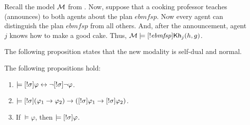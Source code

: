 \begin{example}\label{ex:sref}
Recall the model $\mathcal{M}$ from .
Now, suppose that a cooking professor teaches (announces) to both agents about the plan $\mathit{ebmfsp}$.
Now every agent can distinguish the plan $\mathit{ebmfsp}$ from all others.
And, after the announcement, agent~$j$ knows how to make a good cake.
Thus, $\mathcal{M} \models [!\mathit{ebmfsp}] {\sf Kh}_j(h,g)$.
\end{example}

\medskip

The following proposition states that the new modality is self-dual and normal.

\medskip 

\begin{proposition}
The following propositions hold:
\begin{enumerate}
\item $\models [!\sigma]\varphi \leftrightarrow \neg[!\sigma]\neg\varphi$. 
\item $\models [!\sigma](\varphi_1 \rightarrow \varphi_2) \rightarrow ([!\sigma]\varphi_1 \rightarrow [!\sigma]\varphi_2)$.
\item If $\models \varphi$, then $\models [!\sigma]\varphi$.
\end{enumerate}
\end{proposition}

\medskip 


